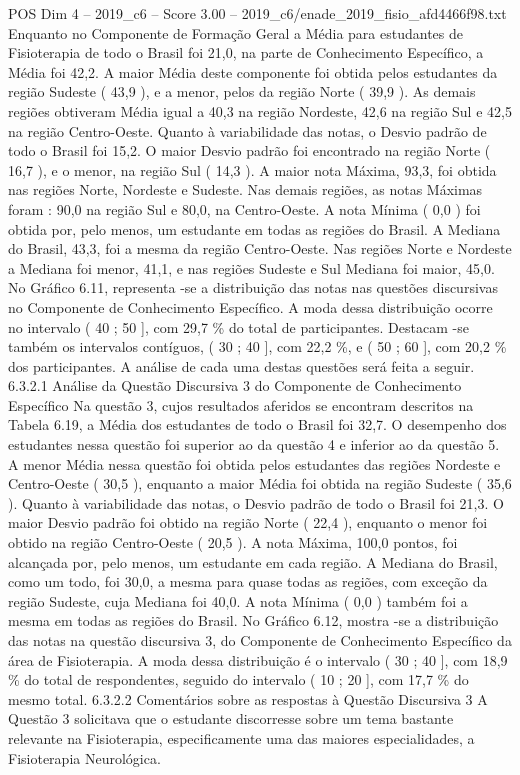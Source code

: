\begin{textsample}{POS Dim 4 – 2019\_c6 – Score 3.00 – 2019\_c6/enade\_2019\_fisio\_afd4466f98.txt}
Enquanto no Componente de Formação Geral a Média para estudantes de Fisioterapia de todo o Brasil foi 21,0, na parte de Conhecimento Específico, a Média foi 42,2.
A maior Média deste componente foi obtida pelos estudantes da região Sudeste ( 43,9 ), e a menor, pelos da região Norte ( 39,9 ).
As demais regiões obtiveram Média igual a 40,3 na região Nordeste, 42,6 na região Sul e 42,5 na região Centro-Oeste.
Quanto à variabilidade das notas, o Desvio padrão de todo o Brasil foi 15,2.
O maior Desvio padrão foi encontrado na região Norte ( 16,7 ), e o menor, na região Sul ( 14,3 ).
A maior nota Máxima, 93,3, foi obtida nas regiões Norte, Nordeste e Sudeste.
Nas demais regiões, as notas Máximas foram : 90,0 na região Sul e 80,0, na Centro-Oeste.
A nota Mínima ( 0,0 ) foi obtida por, pelo menos, um estudante em todas as regiões do Brasil.
A Mediana do Brasil, 43,3, foi a mesma da região Centro-Oeste.
Nas regiões Norte e Nordeste a Mediana foi menor, 41,1, e nas regiões Sudeste e Sul Mediana foi maior, 45,0.
No Gráfico 6.11, representa -se a distribuição das notas nas questões discursivas no Componente de Conhecimento Específico.
A moda dessa distribuição ocorre no intervalo ( 40 ; 50 ], com 29,7 \% do total de participantes.
Destacam -se também os intervalos contíguos, ( 30 ; 40 ], com 22,2 \%, e ( 50 ; 60 ], com 20,2 \% dos participantes.
A análise de cada uma destas questões será feita a seguir. 6.3.2.1 Análise da Questão Discursiva 3 do Componente de Conhecimento Específico Na questão 3, cujos resultados aferidos se encontram descritos na Tabela 6.19, a Média dos estudantes de todo o Brasil foi 32,7.
O desempenho dos estudantes nessa questão foi superior ao da questão 4 e inferior ao da questão 5.
A menor Média nessa questão foi obtida pelos estudantes das regiões Nordeste e Centro-Oeste ( 30,5 ), enquanto a maior Média foi obtida na região Sudeste ( 35,6 ).
Quanto à variabilidade das notas, o Desvio padrão de todo o Brasil foi 21,3.
O maior Desvio padrão foi obtido na região Norte ( 22,4 ), enquanto o menor foi obtido na região Centro-Oeste ( 20,5 ).
A nota Máxima, 100,0 pontos, foi alcançada por, pelo menos, um estudante em cada região.
A Mediana do Brasil, como um todo, foi 30,0, a mesma para quase todas as regiões, com exceção da região Sudeste, cuja Mediana foi 40,0.
A nota Mínima ( 0,0 ) também foi a mesma em todas as regiões do Brasil.
No Gráfico 6.12, mostra -se a distribuição das notas na questão discursiva 3, do Componente de Conhecimento Específico da área de Fisioterapia.
A moda dessa distribuição é o intervalo ( 30 ; 40 ], com 18,9 \% do total de respondentes, seguido do intervalo ( 10 ; 20 ], com 17,7 \% do mesmo total. 6.3.2.2 Comentários sobre as respostas à Questão Discursiva 3 A Questão 3 solicitava que o estudante discorresse sobre um tema bastante relevante na Fisioterapia, especificamente uma das maiores especialidades, a Fisioterapia Neurológica.

\end{textsample}
